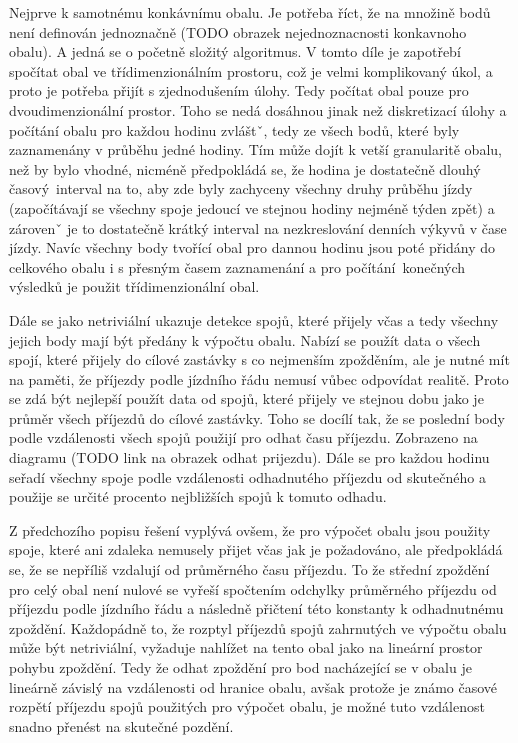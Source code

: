 Nejprve k samotnému konkávnímu obalu. Je potřeba říct, že na množině bodů není definován jednoznačně (TODO obrazek nejednoznacnosti konkavnoho obalu). A jedná se o početně složitý algoritmus. V tomto díle je zapotřebí spočítat obal ve třídimenzionálním prostoru, což je velmi komplikovaný úkol, a proto je potřeba přijít s zjednodušením úlohy. Tedy počítat obal pouze pro dvoudimenzionální prostor. Toho se nedá dosáhnou jinak než diskretizací úlohy a počítání obalu pro každou hodinu zvláštˇ, tedy ze všech bodů, které byly zaznamenány v průběhu jedné hodiny. Tím může dojít k vetší granularitě obalu, než by bylo vhodné, nicméně předpokládá se, že hodina je dostatečně dlouhý časový interval na to, aby zde byly zachyceny všechny druhy průběhu jízdy (započítávají se všechny spoje jedoucí ve stejnou hodiny nejméně týden zpět) a zárovenˇ je to dostatečně krátký interval na nezkreslování denních výkyvů v čase jízdy. Navíc všechny body tvořící obal pro dannou hodinu jsou poté přidány do celkového obalu i s přesným časem zaznamenání a pro počítání konečných výsledků je použit třídimenzionální obal.

\bigbreak

Dále se jako netriviální ukazuje detekce spojů, které přijely včas a tedy všechny jejich body mají být předány k výpočtu obalu. Nabízí se použít data o všech spojí, které přijely do cílové zastávky s co nejmenším zpožděním, ale je nutné mít na paměti, že příjezdy podle jízdního řádu nemusí vůbec odpovídat realitě. Proto se zdá být nejlepší použít data od spojů, které přijely ve stejnou dobu jako je průměr všech příjezdů do cílové zastávky. Toho se docílí tak, že se poslední body podle vzdálenosti všech spojů použijí pro odhat času příjezdu. Zobrazeno na diagramu (TODO link na obrazek odhat prijezdu). Dále se pro každou hodinu seřadí všechny spoje podle vzdálenosti odhadnutého příjezdu od skutečného a použije se určité procento nejbližších spojů k tomuto odhadu.

\bigbreak

Z předchozího popisu řešení vyplývá ovšem, že pro výpočet obalu jsou použity spoje, které ani zdaleka nemusely přijet včas jak je požadováno, ale předpokládá se, že se nepříliš vzdalují od průměrného času příjezdu. To že střední zpoždění pro celý obal není nulové se vyřeší spočtením odchylky průměrného příjezdu od příjezdu podle jízdního řádu a následně přičtení této konstanty k odhadnutnému zpoždění. Každopádně to, že rozptyl příjezdů spojů zahrnutých ve výpočtu obalu může být netriviální, vyžaduje nahlížet na tento obal jako na lineární prostor pohybu zpoždění. Tedy že odhat zpoždění pro bod nacházející se v obalu je lineárně závislý na vzdálenosti od hranice obalu, avšak protože je známo časové rozpětí příjezdu spojů použitých pro výpočet obalu, je možné tuto vzdálenost snadno přenést na skutečné pozdění.


